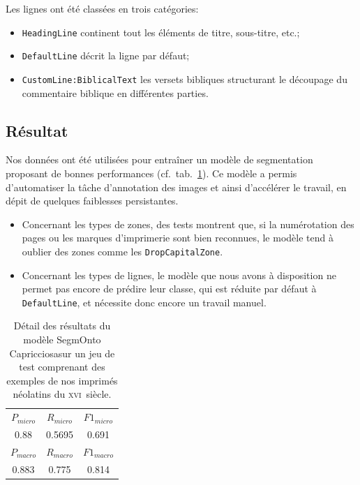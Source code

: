 \documentclass[11pt,french]{article}
\begin{document}
Les lignes ont été classées en trois catégories:
\begin{itemize}
    \item \texttt{HeadingLine} continent tout les éléments de titre, sous-titre, etc.;
    \item \texttt{DefaultLine} décrit la ligne par défaut;
    \item \texttt{CustomLine:BiblicalText} les versets bibliques structurant le découpage du commentaire biblique en différentes parties.
\end{itemize}

\subsection{Résultat}

Nos données ont été utilisées pour entraîner un modèle de segmentation \cite{humeau_2024_10602197,solfrini:hal-04555002} proposant de bonnes performances (cf.~tab.~\ref{tab:evaluation_f1}). Ce modèle a permis d'automatiser la tâche d'annotation des images et ainsi d'accélérer le travail, en dépit de quelques faiblesses persistantes.

\begin{itemize}
    \item Concernant les types de zones, des tests montrent que, si la numérotation des pages ou les marques d'imprimerie sont bien reconnues, le modèle tend à oublier des zones comme les \texttt{DropCapitalZone}.
    \item Concernant les types de lignes, le modèle que nous avons à disposition ne permet pas encore de prédire leur classe, qui est réduite par défaut à \texttt{DefaultLine}, et nécessite donc encore un travail manuel.
\end{itemize}

\begin{table}[htp]
    \centering\small
    \begin{tabular*}{\linewidth}{@{\extracolsep{\fill}}ccc}
        \toprule
         $P_{micro}$ & $R_{micro}$ & $F1_{micro}$ \\
         0.88 & 0.5695 & 0.691 \\
        \midrule
         $P_{macro}$ & $R_{macro}$ & $F1_{macro}$ \\
        0.883 & 0.775 & 0.814 \\
        \bottomrule
    \end{tabular*}
    \caption{Détail des résultats du modèle SegmOnto \guillemotleft Capricciosa\guillemotright sur un jeu de test comprenant des exemples de nos imprimés néolatins du \textsc{xvi}\ieme{}~siècle.}
    \label{tab:evaluation_f1}
\end{table}
\end{document}
